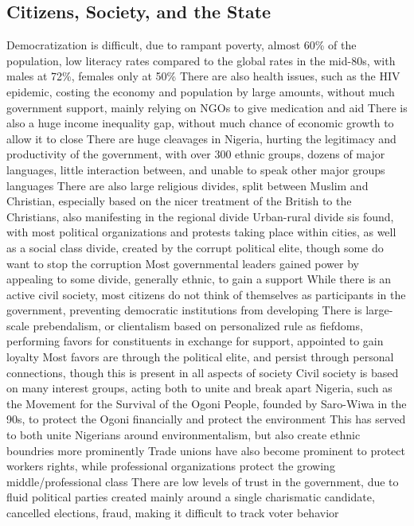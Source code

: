 \documentclass[11 pt, twoside]{article}
\newenvironment{outline*}
{
	\begin{outline}[enumerate]
	}
	{\end{outline}
}
\begin{document}
\subsection{Citizens, Society, and the State}
\begin{outline*}
\1 Democratization is difficult, due to rampant poverty, almost 60\% of the population, low literacy rates compared to the global rates in the mid-80s, with males at 72\%, females only at 50\%
\2 There are also health issues, such as the HIV epidemic, costing the economy and population by large amounts, without much government support, mainly relying on NGOs to give medication and aid
\2 There is also a huge income inequality gap, without much chance of economic growth to allow it to close
\1 There are huge cleavages in Nigeria, hurting the legitimacy and productivity of the government, with over 300 ethnic groups, dozens of major languages, little interaction between, and unable to speak other major groups languages
\2 There are also large religious divides, split between Muslim and Christian, especially based on the nicer treatment of the British to the Christians, also manifesting in the regional divide
\2 Urban-rural divide sis found, with most political organizations and protests taking place within cities, as well as a social class divide, created by the corrupt political elite, though some do want to stop the corruption
\2 Most governmental leaders gained power by appealing to some divide, generally ethnic, to gain a support
\1 While there is an active civil society, most citizens do not think of themselves as participants in the government, preventing democratic institutions from developing
\2 There is large-scale prebendalism, or clientalism based on personalized rule as fiefdoms, performing favors for constituents in exchange for support, appointed to gain loyalty
\3 Most favors are through the political elite, and persist through personal connections, though this is present in all aspects of society
\2 Civil society is based on many interest groups, acting both to unite and break apart Nigeria, such as the Movement for the Survival of the Ogoni People, founded by Saro-Wiwa in the 90s, to protect the Ogoni financially and protect the environment
\3 This has served to both unite Nigerians around environmentalism, but also create ethnic boundries more prominently
\3 Trade unions have also become prominent to protect workers rights, while professional organizations protect the growing middle/professional class
\2 There are low levels of trust in the government, due to fluid political parties created mainly around a single charismatic candidate, cancelled elections, fraud, making it difficult to track voter behavior

\end{outline*}
\end{document}
